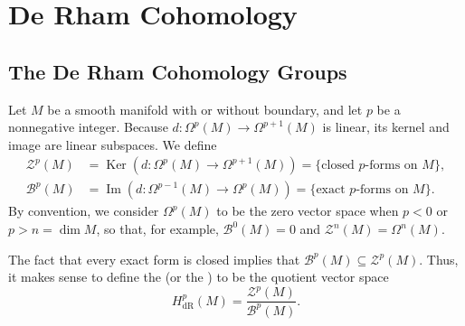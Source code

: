 \documentclass[../main.tex]{subfiles}
\begin{document}
\ifSubfilesClassLoaded{

    
}{}

\chapter{ De Rham Cohomology }

\section{The De Rham Cohomology Groups}
\begin{definition}{}{}
    Let $M$ be a smooth manifold with or without boundary, and let $p$ be a nonnegative integer. Because $d: \Omega^{p}(M) \rightarrow \Omega^{p+1}(M)$ is linear, its kernel and image are linear subspaces. We define
\[
\begin{aligned}
\mathcal{Z}^{p}(M) &= \operatorname{Ker}\left(d: \Omega^{p}(M) \rightarrow \Omega^{p+1}(M)\right)=\{\text {closed } p \text {-forms on } M\}, \\
\mathcal{B}^{p}(M) &= \operatorname{Im}\left(d: \Omega^{p-1}(M) \rightarrow \Omega^{p}(M)\right)=\{\text {exact } p \text {-forms on } M\} .
\end{aligned}
\]
By convention, we consider $\Omega^{p}(M)$ to be the zero vector space when $p<0$ or $p>n=\operatorname{dim} M$, so that, for example, $\mathcal{B}^{0}(M)=0$ and $\mathcal{Z}^{n}(M)=\Omega^{n}(M)$.
\end{definition}

\begin{definition}{}{}
    The fact that every exact form is closed implies that $\mathcal{B}^p(M) \subseteq \mathcal{Z}^p(M)$. Thus, it makes sense to define the  (or the )  to be the quotient vector space
\[
H_{\mathrm{dR}}^p(M) = \frac{\mathcal{Z}^p(M)}{\mathcal{B}^p(M)}.
\]
\end{definition}
\end{document}
